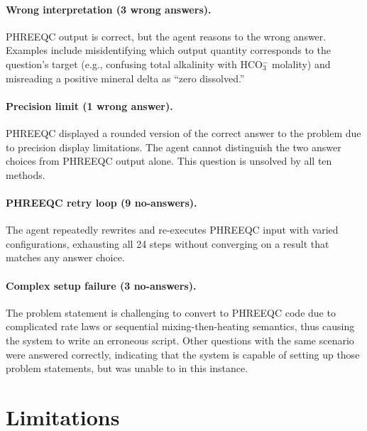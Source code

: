 \documentclass[sigconf,anonymous]{acmart}
\begin{document}
\paragraph{Wrong interpretation (3 wrong answers).}
PHREEQC output is correct, but the agent reasons to the wrong answer. Examples include misidentifying which output quantity corresponds to the question's target (e.g., confusing total alkalinity with HCO$_3^-$ molality) and misreading a positive mineral delta as ``zero dissolved.''

\paragraph{Precision limit (1 wrong answer).}
PHREEQC displayed a rounded version of the correct answer to the problem due to precision display limitations. The agent cannot distinguish the two answer choices from PHREEQC output alone. This question is unsolved by all ten methods.

\paragraph{PHREEQC retry loop (9 no-answers).}
The agent repeatedly rewrites and re-executes PHREEQC input with varied configurations, exhausting all 24 steps without converging on a result that matches any answer choice.

\paragraph{Complex setup failure (3 no-answers).}
The problem statement is challenging to convert to PHREEQC code due to complicated rate laws or sequential mixing-then-heating semantics, thus causing the system to write an erroneous script. Other questions with the same scenario were answered correctly, indicating that the system is capable of setting up those problem statements, but was unable to in this instance.


\section{Limitations}
\label{sec:limitations}
\end{document}

